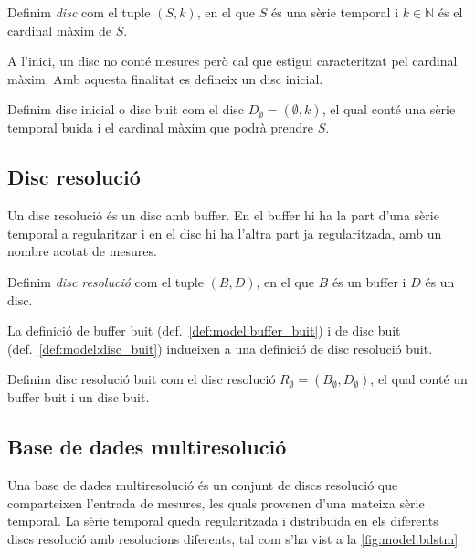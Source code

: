 \begin{definition}[Disc]
  Definim \emph{disc} com el tuple $(S,k)$, en el que $S$
  és una sèrie temporal i $k\in\mathbb{N}$ és el cardinal màxim de $S$.
\end{definition}

A l'inici, un disc no conté mesures però cal que estigui caracteritzat pel cardinal màxim. Amb aquesta finalitat es defineix un disc inicial.

\begin{definition}\label{def:model:disc_buit}
  Definim disc inicial o disc buit com el disc $D_{\emptyset} =
  (\emptyset,k)$, el qual conté una sèrie temporal buida i el cardinal
  màxim que podrà prendre $S$.
\end{definition}




\subsection{Disc resolució}\label{sec:model:disc_multiresolució}

Un disc resolució és un disc amb buffer. En el buffer hi ha la part d'una sèrie temporal a regularitzar i en el disc hi ha l'altra part ja regularitzada, amb un nombre acotat de mesures. 

\begin{definition}
  Definim \emph{disc resolució} com el tuple $(B,D)$, en el que $B$
  és un buffer i $D$ és un disc.
\end{definition}
 
La definició de buffer buit (def.~\ref{def:model:buffer_buit}) i de disc buit (def.~\ref{def:model:disc_buit}) indueixen a una definició de disc resolució buit. 

\begin{definition}\label{def:model:disc_resolucio_buit}
  Definim disc resolució buit com el disc resolució $R_{\emptyset}
  = (B_{\emptyset},D_{\emptyset})$, el qual conté un buffer buit i un
  disc buit.
\end{definition}




\subsection{Base de dades multiresolució}\label{sec:model:bdstm}

Una base de dades multiresolució és un conjunt de discs resolució que comparteixen l'entrada de mesures, les quals provenen d'una mateixa sèrie temporal. La sèrie temporal queda regularitzada i distribuïda  en els diferents discs resolució amb resolucions diferents, tal com s'ha vist a la \autoref{fig:model:bdstm}


